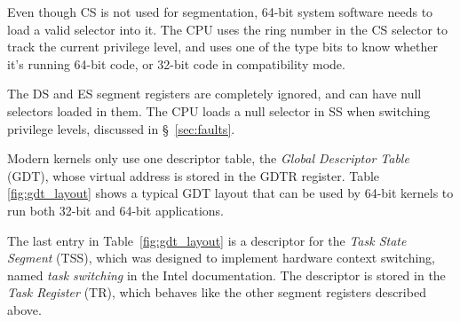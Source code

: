 Even though CS is not used for segmentation, 64-bit system software needs to
load a valid selector into it. The CPU uses the ring number in the CS selector
to track the current privilege level, and uses one of the type bits to know
whether it's running 64-bit code, or 32-bit code in compatibility mode.


The DS and ES segment registers are completely ignored, and can have null
selectors loaded in them. The CPU loads a null selector in SS when switching
privilege levels, discussed in \S~\ref{sec:faults}.


Modern kernels only use one descriptor table, the \textit{Global Descriptor
Table} (GDT), whose virtual address is stored in the GDTR register. Table~
\ref{fig:gdt_layout} shows a typical GDT layout that can be used by 64-bit
kernels to run both 32-bit and 64-bit applications.

\begin{table}[hbt]
  \caption{
    A typical GDT layout in the 64-bit Intel Architecture.
  }
  \label{fig:gdt_layout}
\end{table}


The last entry in Table~\ref{fig:gdt_layout} is a descriptor for the
\textit{Task State Segment} (TSS), which was designed to implement hardware
context switching, named \textit{task switching} in the Intel documentation.
The descriptor is stored in the \textit{Task Register} (TR), which behaves like
the other segment registers described above.

